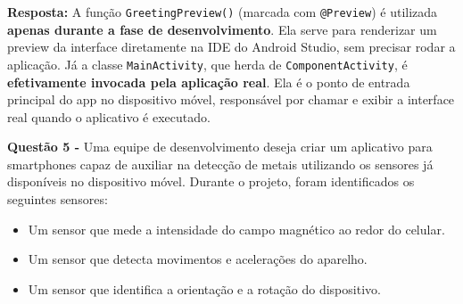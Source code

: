 \documentclass[12pt,a4paper]{article}
\begin{document}
\vspace{0.3cm}
\textbf{Resposta:} A função \texttt{GreetingPreview()} (marcada com \texttt{@Preview}) é utilizada \textbf{apenas durante a fase de desenvolvimento}. Ela serve para renderizar um preview da interface diretamente na IDE do Android Studio, sem precisar rodar a aplicação. Já a classe \texttt{MainActivity}, que herda de \texttt{ComponentActivity}, é \textbf{efetivamente invocada pela aplicação real}. Ela é o ponto de entrada principal do app no dispositivo móvel, responsável por chamar e exibir a interface real quando o aplicativo é executado.

\vspace{0.5cm}

\textbf{Questão 5 - } Uma equipe de desenvolvimento deseja criar um aplicativo para smartphones capaz de auxiliar na detecção de metais utilizando os sensores já disponíveis no dispositivo móvel. Durante o projeto, foram identificados os seguintes sensores:

\begin{itemize}[leftmargin=1.5em]
  \item Um sensor que mede a intensidade do campo magnético ao redor do celular.
  \item Um sensor que detecta movimentos e acelerações do aparelho.
  \item Um sensor que identifica a orientação e a rotação do dispositivo.
\end{itemize}

\vspace{0.4cm}
\end{document}
